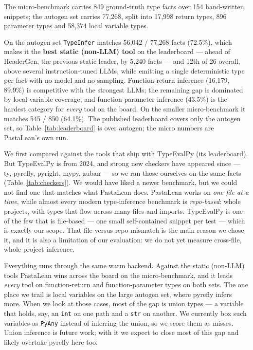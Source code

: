 \documentclass{article}
\newcommand{\code}{\lstinline}
\begin{document}
The micro-benchmark carries 849 ground-truth type facts over 154 hand-written snippets; the autogen set carries 77{,}268, split into 17{,}998 return types, 896 parameter types and 58{,}374 local variable types. 

On the autogen set \code{TypeInfer} matches 56{,}042 / 77{,}268 facts (72.5\%), which makes it the \textbf{best static (non-LLM) tool} on the leaderboard --- ahead of HeaderGen, the previous static leader, by 5{,}240 facts --- and 12th of 26 overall, above several instruction-tuned LLMs, while emitting a single deterministic type per fact with no model and no sampling. Function-return inference (16{,}179, 89.9\%) is competitive with the strongest LLMs; the remaining gap is dominated by local-variable coverage, and function-parameter inference (43.5\%) is the hardest category for \emph{every} tool on the board. On the smaller micro-benchmark it matches 545 / 850 (64.1\%). The published leaderboard covers only the autogen set, so Table~\ref{tab:leaderboard} is over autogen; the micro numbers are PastaLean's own run.

We first compared against the tools that ship with TypeEvalPy (its leaderboard). But TypeEvalPy is from 2024, and strong new checkers have appeared since --- ty, pyrefly, pyright, mypy, zuban --- so we ran those ourselves on the same facts (Table~\ref{tab:checkers}). We would have liked a newer benchmark, but we could not find one that matches what PastaLean does. PastaLean works on \emph{one file at a time}, while almost every modern type-inference benchmark is \emph{repo-based}: whole projects, with types that flow across many files and imports. TypeEvalPy is one of the few that is file-based --- one small self-contained snippet per test --- which is exactly our scope. That file-versus-repo mismatch is the main reason we chose it, and it is also a limitation of our evaluation: we do not yet measure cross-file, whole-project inference.

Everything runs through the same warm backend. Against the static (non-LLM) tools PastaLean wins across the board on the micro-benchmark, and it leads \emph{every} tool on function-return and function-parameter types on both sets. The one place we trail is local variables on the large autogen set, where pyrefly infers more. When we look at those cases, most of the gap is union types --- a variable that holds, say, an \code{int} on one path and a \code{str} on another. We currently box such variables as \code{PyAny} instead of inferring the union, so we score them as misses. Union inference is future work; with it we expect to close most of this gap and likely overtake pyrefly here too.
\end{document}
